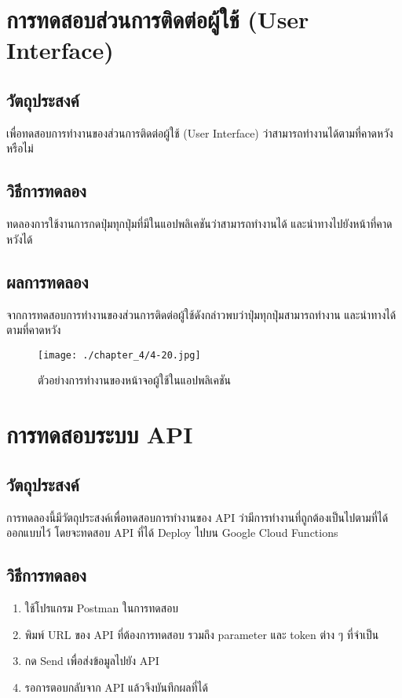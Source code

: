 \section{การทดสอบส่วนการติดต่อผู้ใช้ (User Interface)}
\tocless\subsection{วัตถุประสงค์}
เพื่อทดสอบการทำงานของส่วนการติดต่อผู้ใช้ (User Interface) ว่าสามารถทำงานได้ตามที่คาดหวังหรือไม่
\tocless\subsection{วิธีการทดลอง}
ทดลองการใช้งานการกดปุ่มทุกปุ่มที่มีในแอปพลิเคชันว่าสามารถทำงานได้ และนำทางไปยังหน้าที่คาดหวังได้
\tocless\subsection{ผลการทดลอง}
จากการทดสอบการทำงานของส่วนการติดต่อผู้ใช้ดังกล่าวพบว่าปุ่มทุกปุ่มสามารถทำงาน และนำทางได้ตามที่คาดหวัง
\begin{figure}
	\texttt{[image: ./chapter\_4/4-20.jpg]}
	\caption{ตัวอย่างการทำงานของหน้าจอผู้ใช้ในแอปพลิเคชัน}
\end{figure}

\section{การทดสอบระบบ API}
\tocless\subsection{วัตถุประสงค์}
การทดลองนี้มีวัตถุประสงค์เพื่อทดสอบการทำงานของ API ว่ามีการทำงานที่ถูกต้องเป็นไปตามที่ได้ออกแบบไว้ โดยจะทดสอบ API ที่ได้ Deploy ไปบน Google Cloud Functions
\tocless\subsection{วิธีการทดลอง}
\begin{enumerate}
	\item ใช้โปรแกรม Postman ในการทดสอบ
	\item พิมพ์ URL ของ API ที่ต้องการทดสอบ รวมถึง parameter และ token ต่าง ๆ ที่จำเป็น
	\item กด Send เพื่อส่งข้อมูลไปยัง API
	\item รอการตอบกลับจาก API แล้วจึงบันทึกผลที่ได้
\end{enumerate}
